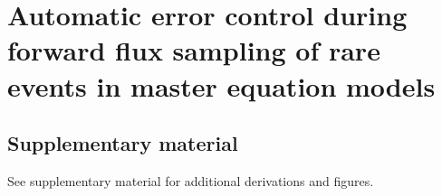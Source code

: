 


%

\chapter{Automatic error control during forward flux sampling of rare events in master equation models}\label{sec:eces_chapter}





%

%

\section*{Supplementary material}
See supplementary material for additional derivations and figures.

